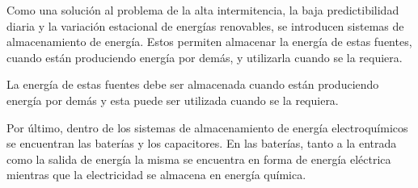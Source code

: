 Como una solución al problema de la alta intermitencia, la baja predictibilidad 
diaria y la variación estacional de energías renovables, se introducen sistemas 
de almacenamiento de energía. Estos permiten almacenar la energía de estas 
fuentes, cuando están produciendo energía por demás, y utilizarla cuando se la 
requiera.

La energía de estas fuentes debe ser almacenada 
cuando están produciendo energía por demás y esta puede ser utilizada cuando se 
la requiera. 

Por último, dentro de los sistemas de almacenamiento de energía electroquímicos 
se encuentran las baterías y los capacitores. En las baterías, tanto a la entrada 
como la salida de energía la misma se encuentra en forma de energía eléctrica 
mientras que la electricidad se almacena en energía química. 
